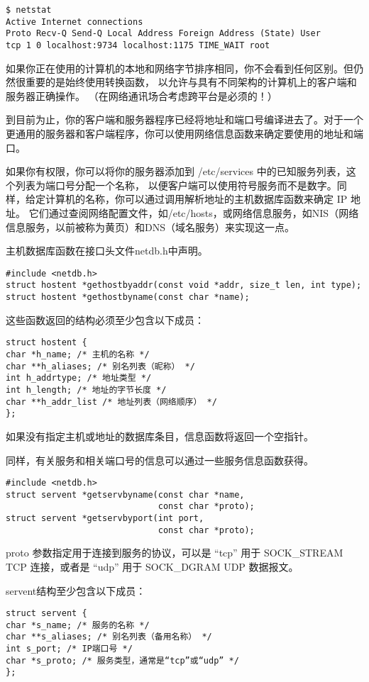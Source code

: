 \documentclass{ctexart}
\begin{document}
\begin{verbatim}  
$ netstat  
Active Internet connections  
Proto Recv-Q Send-Q Local Address Foreign Address (State) User  
tcp 1 0 localhost:9734 localhost:1175 TIME_WAIT root  
\end{verbatim}  

如果你正在使用的计算机的本地和网络字节排序相同，你不会看到任何区别。但仍然很重要的是始终使用转换函数，
以允许与具有不同架构的计算机上的客户端和服务器正确操作。  （在网络通讯场合考虑跨平台是必须的！）
 
到目前为止，你的客户端和服务器程序已经将地址和端口号编译进去了。对于一个更通用的服务器和客户端程序，你可以使用网络信息函数来确定要使用的地址和端口。  
  
如果你有权限，你可以将你的服务器添加到 /etc/services 中的已知服务列表，这个列表为端口号分配一个名称，
以便客户端可以使用符号服务而不是数字。同样，给定计算机的名称，你可以通过调用解析地址的主机数据库函数来确定 IP 地址。
它们通过查阅网络配置文件，如/etc/hosts，或网络信息服务，如NIS（网络信息服务，以前被称为黄页）和DNS（域名服务）来实现这一点。  

主机数据库函数在接口头文件netdb.h中声明。  
\begin{verbatim}  
#include <netdb.h>  
struct hostent *gethostbyaddr(const void *addr, size_t len, int type);  
struct hostent *gethostbyname(const char *name);  
\end{verbatim}  
这些函数返回的结构必须至少包含以下成员：  
\begin{verbatim}  
struct hostent {  
char *h_name; /* 主机的名称 */  
char **h_aliases; /* 别名列表（昵称） */  
int h_addrtype; /* 地址类型 */  
int h_length; /* 地址的字节长度 */  
char **h_addr_list /* 地址列表（网络顺序） */  
};  
\end{verbatim}  
如果没有指定主机或地址的数据库条目，信息函数将返回一个空指针。  

同样，有关服务和相关端口号的信息可以通过一些服务信息函数获得。  
\begin{verbatim}  
#include <netdb.h>  
struct servent *getservbyname(const char *name, 
                              const char *proto);  
struct servent *getservbyport(int port, 
                              const char *proto);  
\end{verbatim}  

proto 参数指定用于连接到服务的协议，可以是 ``tcp'' 用于 SOCK\_STREAM TCP 连接，或者是 ``udp'' 用于 SOCK\_DGRAM UDP 数据报文。

servent结构至少包含以下成员：  
\begin{verbatim}  
struct servent {  
char *s_name; /* 服务的名称 */  
char **s_aliases; /* 别名列表（备用名称） */  
int s_port; /* IP端口号 */  
char *s_proto; /* 服务类型，通常是“tcp”或“udp” */  
};  
\end{verbatim}  
\end{document}
